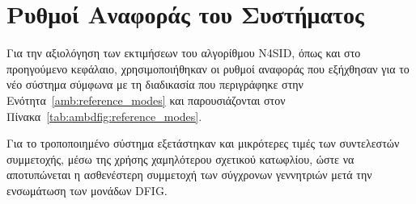 \section{Ρυθμοί Αναφοράς του Συστήματος}
Για την αξιολόγηση των εκτιμήσεων του αλγορίθμου N4SID, όπως και στο προηγούμενο κεφάλαιο, χρησιμοποιήθηκαν οι ρυθμοί αναφοράς που εξήχθησαν για το νέο σύστημα σύμφωνα με τη διαδικασία που περιγράφηκε στην Ενότητα~\ref{amb:reference_modes} και παρουσιάζονται στον Πίνακα~\ref{tab:ambdfig:reference_modes}.

Για το τροποποιημένο σύστημα εξετάστηκαν και μικρότερες τιμές των συντελεστών συμμετοχής, μέσω της χρήσης χαμηλότερου σχετικού κατωφλίου, ώστε να αποτυπώνεται η ασθενέστερη συμμετοχή των σύγχρονων γεννητριών μετά την ενσωμάτωση των μονάδων DFIG.

\begin{table}[htbp]
    \centering
    \caption{Ηλεκτρομηχανικοί ρυθμοί αναφοράς του τροποποιημένου συστήματος IEEE 39-Bus με μονάδες DFIG.}
    \label{tab:ambdfig:reference_modes}
\end{table}

